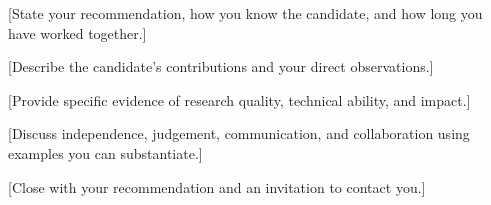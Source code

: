 \documentclass[11pt,letterpaper]{article}
\begin{document}
\MakeLetterHeading

[State your recommendation, how you know the candidate, and how long you
have worked together.]

[Describe the candidate's contributions and your direct observations.]

[Provide specific evidence of research quality, technical ability, and impact.]

[Discuss independence, judgement, communication, and collaboration using
examples you can substantiate.]

[Close with your recommendation and an invitation to contact you.]

\MakeLetterClosing
\end{document}

